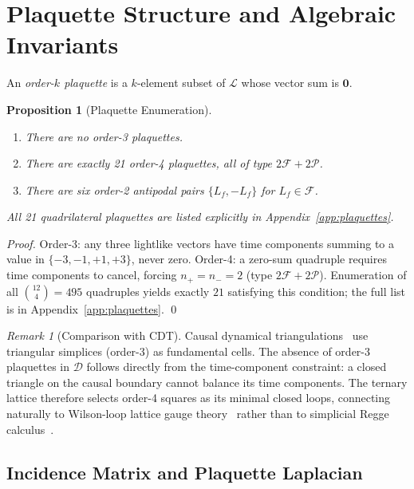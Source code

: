 \documentclass[12pt, a4paper]{article}
\theoremstyle{plain}
\newtheorem{proposition}[theorem]{Proposition}
\theoremstyle{definition}
\theoremstyle{remark}
\newtheorem{remark}[theorem]{Remark}
\newcommand{\CD}{\mathscr{D}}
\newcommand{\LL}{\mathcal{L}}
\newcommand{\FS}{\mathcal{F}}
\newcommand{\PS}{\mathcal{P}}
\begin{document}
\section{Plaquette Structure and Algebraic Invariants}\label{sec:plaquettes}

An \emph{order-$k$ plaquette} is a $k$-element subset of $\LL$
whose vector sum is $\bm{0}$.

\begin{proposition}[Plaquette Enumeration]\label{prop:plaquettes}
\begin{enumerate}[label=(\roman*), noitemsep]
  \item There are no order-3 plaquettes.
  \item There are exactly 21 order-4 plaquettes, all of type
    $2\FS+2\PS$.
  \item There are six order-2 antipodal pairs
    $\{L_f,-L_f\}$ for $L_f\in\FS$.
\end{enumerate}
All 21 quadrilateral plaquettes are listed explicitly in
Appendix~\ref{app:plaquettes}.
\end{proposition}

\begin{proof}
Order-3: any three lightlike vectors have time components
summing to a value in $\{-3,-1,+1,+3\}$, never zero.
Order-4: a zero-sum quadruple requires time components to cancel,
forcing $n_+=n_-=2$ (type $2\FS+2\PS$).
Enumeration of all $\binom{12}{4}=495$ quadruples yields exactly
$21$ satisfying this condition; the full list is in
Appendix~\ref{app:plaquettes}.
\qed
\end{proof}

\begin{remark}[Comparison with CDT]\label{rem:cdt}
Causal dynamical triangulations~\cite{Ambjorn2004} use
triangular simplices (order-3) as fundamental cells.
The absence of order-3 plaquettes in $\CD$ follows directly
from the time-component constraint: a closed triangle on the
causal boundary cannot balance its time components.
The ternary lattice therefore selects order-4 squares as its
minimal closed loops, connecting naturally to Wilson-loop
lattice gauge theory~\cite{Wilson1974} rather than to
simplicial Regge calculus~\cite{Regge1961}.
\end{remark}

\subsection{Incidence Matrix and Plaquette Laplacian}
\end{document}
